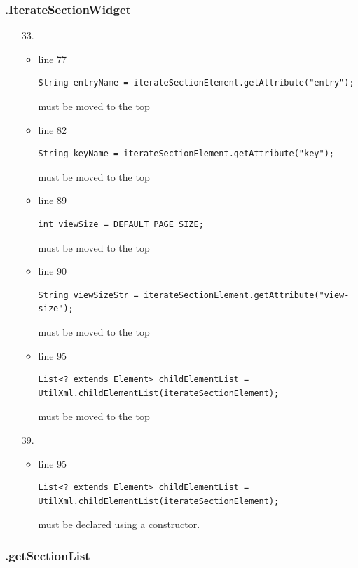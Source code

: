 \documentclass[english]{article}
\begin{document}
\subsubsection*{.IterateSectionWidget}
\begin{itemize}
		\item[33.]{ 
			\begin{itemize}
				\item{line 77
						\begin{lstlisting}
String entryName = iterateSectionElement.getAttribute("entry");
						\end{lstlisting} must be moved to the top}
				\item{line 82
						\begin{lstlisting}
String keyName = iterateSectionElement.getAttribute("key");
						\end{lstlisting} must be moved to the top}
				\item{line 89
						\begin{lstlisting}
int viewSize = DEFAULT_PAGE_SIZE;
						\end{lstlisting} must be moved to the top}
				\item{line 90
						\begin{lstlisting}
String viewSizeStr = iterateSectionElement.getAttribute("view-size");
						\end{lstlisting} must be moved to the top}
				\item{line 95
						\begin{lstlisting}
List<? extends Element> childElementList = UtilXml.childElementList(iterateSectionElement);
						\end{lstlisting} must be moved to the top}
			\end{itemize}
}
		\item[39.]{ 
			\begin{itemize}
				\item{line 95
						\begin{lstlisting}
List<? extends Element> childElementList = UtilXml.childElementList(iterateSectionElement);
						\end{lstlisting} must be declared using a constructor.}
			\end{itemize}
}
\end{itemize}
\subsubsection*{.getSectionList}	
\end{document}
